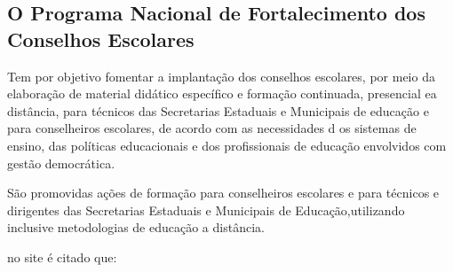 \documentclass[
	12pt,				%
	openright,			%
	oneside,
	a4paper,			%
	chapter=TITLE,		%
	section=TITLE,		%
	sumario=abnt-6027-2012,
	english,			%
	brazil				%
]{abntex2}
\begin{document}
		\subsection{O Programa Nacional de Fortalecimento dos Conselhos Escolares}		
		
		Tem  por  objetivo  fomentar  a  implantação  dos  conselhos  escolares,  por  meio  da elaboração  de   material  didático   específico  e   formação   continuada,  presencial   ea  distância,   para  técnicos   das  Secretarias   Estaduais  e   Municipais   de  educação e   para   conselheiros   escolares,   de   acordo   com   as   necessidades   d os   sistemas de   ensino,   das   políticas   educacionais   e   dos   profissionais   de   educação envolvidos com gestão democrática.
		
		São   promovidas   ações   de   formação   para   conselheiros   escolares   e   para técnicos   e   dirigentes   das   Secretarias   Estaduais   e   Municipais   de   Educação,utilizando inclusive metodologias de educação a distância. 
		
		no site é citado que:
		
\end{document}
